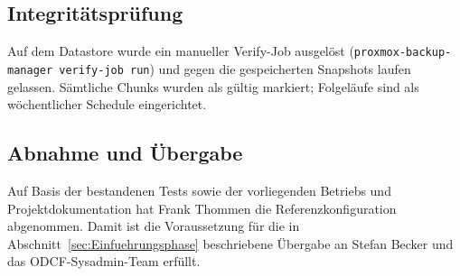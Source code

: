 \subsection{Integritätsprüfung}
Auf dem Datastore wurde ein manueller Verify-Job ausgelöst
(\texttt{proxmox-backup-manager verify-job run}) und gegen die
gespeicherten Snapshots laufen gelassen. Sämtliche Chunks wurden
als gültig markiert; Folgeläufe sind als wöchentlicher
Schedule eingerichtet.

\subsection{Abnahme und Übergabe}
Auf Basis der bestandenen Tests sowie der vorliegenden Betriebs\-
und Projekt\-dokumentation hat Frank Thommen die Referenzkonfiguration
abgenommen. Damit ist die Voraussetzung für die in
Abschnitt~\ref{sec:Einfuehrungsphase} beschriebene Übergabe an
Stefan Becker und das \ac{ODCF}-Sysadmin-Team erfüllt.
